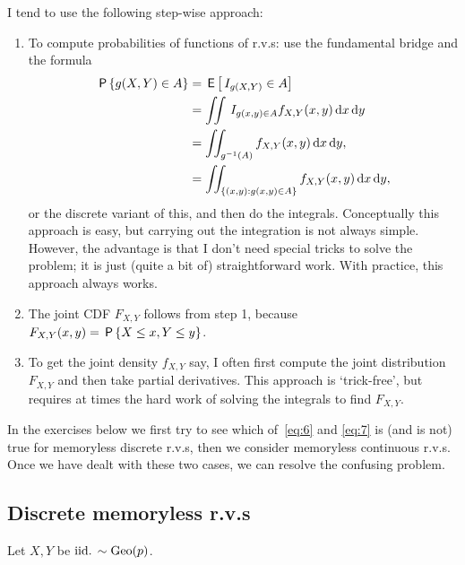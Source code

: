 \documentclass[a4paper,12pt]{article}
\begin{document}
I tend to use the following step-wise approach:
\begin{enumerate}
\item To compute probabilities of functions of r.v.s: use the fundamental bridge and the formula
  \begin{equation}
    \label{eq:55}
    \begin{split}
\P{g(X, Y) \in A} 
&= \E{\1{g(X,Y)}\in A} \\
&= \iint \1{g(x,y) \in A} f_{X,Y}(x,y) \d x \d y \\
&= \iint_{g^{-1}(A)} f_{X,Y}(x, y) \d x \d y,\\
&= \iint_{\{(x,y): g(x,y) \in A\}} f_{X,Y}(x,y) \d x \d y,
    \end{split}
  \end{equation}
or the discrete variant of this, and then do the integrals.
Conceptually this approach is easy, but carrying out the integration is not always simple.
However, the advantage is that I don't need special tricks to solve the problem; it is just (quite a bit of) straightforward work.
With practice, this approach always works.
\item The joint CDF $F_{X,Y}$ follows from step 1, because $F_{X,Y}(x,y) = \P{X\leq x, Y\leq y}$.
\item To get the joint density $f_{X,Y}$ say, I often first compute the joint distribution $F_{X,Y}$ and then take partial derivatives.
  This approach is `trick-free', but requires at times the hard work of solving the integrals to find $F_{X,Y}$.
\end{enumerate}

In the exercises below we first try to see which of~\cref{eq:6} and \cref{eq:7} is (and is not) true for memoryless discrete r.v.s, then we consider memoryless continuous r.v.s. Once we have dealt with these two cases, we can  resolve the confusing problem.


\subsection{Discrete memoryless r.v.s}
\label{sec:set-1}


Let $X,Y$ be $\iid \sim \Geo{p}$.
\end{document}

